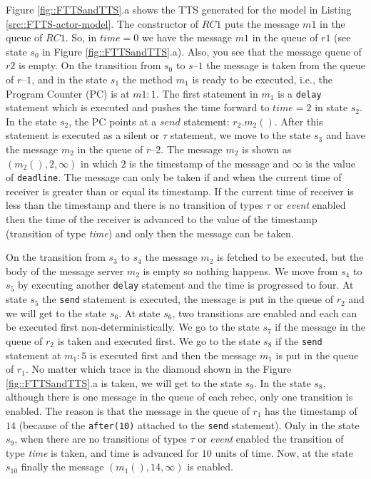 Figure \ref{fig::FTTSandTTS}.a shows the TTS generated for the model in Listing \ref{src::FTTS-actor-model}. 
The constructor of $RC1$ puts the message $m1$ in the queue of $RC1$. So, in $time=0$ we have the message $m1$ in the queue of $r1$ (see state $s_0$ in Figure \ref{fig::FTTSandTTS}.a). Also, you see that the message queue of $r2$ is empty. On the transition from $s_0$ to $s–1$ the message is taken from the queue of $r–1$, and in the state $s_1$ the method $m_1$ is ready to be executed, i.e., the Program Counter (PC) is at $m1:1$. The first statement in $m_1$ is a \texttt{delay} statement which is executed and pushes the time forward to $time=2$ in state $s_2$.
In the state $s_2$, the PC points at a $send$ statement: $r_2.m_2()$. After this statement is executed as a silent or $\tau$ statement, we move to the state $s_3$ and have the message $m_2$ in the queue of $r–2$. The message $m_2$ is shown as $(m_2(), 2, \infty)$ in which $2$ is the timestamp of the message and $\infty$ is the value of \texttt{deadline}. The message can only be taken if and when the current time of receiver is greater than or equal its timestamp. If the current time of receiver is less than the timestamp and there is no transition of types  $\tau$  or \textit{event} enabled then the time of the receiver is advanced to the value of the timestamp (transition of type \textit{time}) and only then the message can be taken.


On the transition from $s_3$ to $s_4$ the message $m_2$ is fetched to be executed, but the body of the message server $m_2$ is empty so nothing happens. We move from $s_4$ to $s_5$ by executing another \texttt{delay} statement and the time is progressed to four.
At state $s_5$ the \texttt{send} statement is executed, the message is put in the queue of $r_2$ and we will get to the state $s_6$.
At state $s_6$, two transitions are enabled and each can be  executed first non-deterministically. 
We go to the state $s_7$ if the message in the queue of $r_2$ is taken and executed first. We go to the state $s_8$ if the \texttt{send} statement at $m_1:5$  is executed first and then the message $m_1$ is put in the queue of $r_1$. No matter which trace in the diamond shown in the Figure \ref{fig::FTTSandTTS}.a is taken, we will get to the state $s_9$.
In the state $s_8$, although there is one message in the queue of each rebec, only one transition is enabled. The reason is that   the message in the queue of $r_1$ has the timestamp of $14$ (because of the \texttt{after(10)} attached to the \texttt{send} statement).
Only in the state $s_9$, when there are no transitions of types $\tau$ or \textit{event}  enabled the transition of type \textit{time} is taken, and time is advanced for $10$ units of time. Now, at the state $s_{10}$ finally the message $(m_1(), 14,\infty )$ is enabled.

